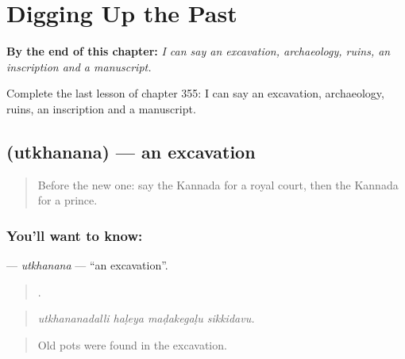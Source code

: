 
\chapter{Digging Up the Past}
\label{ch:ka-digging-up-the-past}

\begin{chapteropening}
\textbf{By the end of this chapter:} \emph{I can say an excavation, archaeology, ruins, an inscription and a manuscript.}

Complete the last lesson of chapter 355: I can say an excavation, archaeology, ruins, an inscription and a manuscript.
\end{chapteropening}

\section[\texorpdfstring{\kn{ಉತ್ಖನನ} (utkhanana)}{ಉತ್ಖನನ (utkhanana)}]{ (utkhanana) — an excavation}

\label{lesson:KA-C355-utkhanana}



\begin{quote}
Before the new one: say the Kannada for a royal court, then the Kannada for a prince.
\end{quote}

\subsection*{You'll want to know: }
\textbf{} — \emph{utkhanana} — \textquotedblleft{}an excavation\textquotedblright{}.

\begin{quote}
   .
\end{quote}

\begin{quote}
\emph{utkhananadalli haḷeya maḍakegaḷu sikkidavu.}
\end{quote}

\begin{quote}
Old pots were found in the excavation.
\end{quote}

